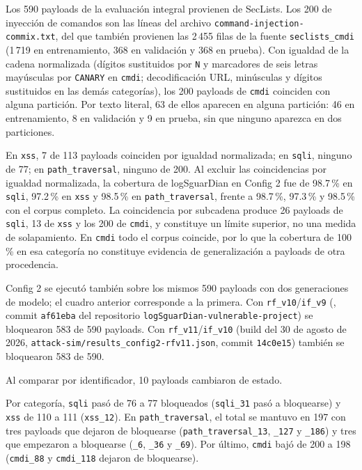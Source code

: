 Los 590 payloads de la evaluación integral provienen de SecLists. Los 200 de inyección de comandos son las líneas del archivo \texttt{command-injection-commix.txt}, del que también provienen las 2\,455 filas de la fuente \texttt{seclists\_cmdi} (1\,719 en entrenamiento, 368 en validación y 368 en prueba). Con igualdad de la cadena normalizada (dígitos sustituidos por \texttt{N} y marcadores de seis letras mayúsculas por \texttt{CANARY} en \texttt{cmdi}; decodificación URL, minúsculas y dígitos sustituidos en las demás categorías), los 200 payloads de \texttt{cmdi} coinciden con alguna partición. Por texto literal, 63 de ellos aparecen en alguna partición: 46 en entrenamiento, 8 en validación y 9 en prueba, sin que ninguno aparezca en dos particiones.

En \texttt{xss}, 7 de 113 payloads coinciden por igualdad normalizada; en \texttt{sqli}, ninguno de 77; en \texttt{path\_traversal}, ninguno de 200. Al excluir las coincidencias por igualdad normalizada, la cobertura de logSguarDian en Config 2 fue de 98.7\,\% en \texttt{sqli}, 97.2\,\% en \texttt{xss} y 98.5\,\% en \texttt{path\_traversal}, frente a 98.7\,\%, 97.3\,\% y 98.5\,\% con el corpus completo. La coincidencia por subcadena produce 26 payloads de \texttt{sqli}, 13 de \texttt{xss} y los 200 de \texttt{cmdi}, y constituye un límite superior, no una medida de solapamiento. En \texttt{cmdi} todo el corpus coincide, por lo que la cobertura de 100\,\% en esa categoría no constituye evidencia de generalización a payloads de otra procedencia.

Config 2 se ejecutó también sobre los mismos 590 payloads con dos generaciones de modelo; el cuadro anterior corresponde a la primera. Con \texttt{rf\_v10}/\texttt{if\_v9} (, commit \texttt{af61eba} del repositorio \texttt{logSguarDian-vulnerable-project}) se bloquearon 583 de 590 payloads. Con \texttt{rf\_v11}/\texttt{if\_v10} (build del 30 de agosto de 2026, \texttt{attack-sim/results\_config2-rfv11.json}, commit \texttt{14c0e15}) también se bloquearon 583 de 590.

Al comparar por identificador, 10 payloads cambiaron de estado.

Por categoría, \texttt{sqli} pasó de 76 a 77 bloqueados (\texttt{sqli\_31} pasó a bloquearse) y \texttt{xss} de 110 a 111 (\texttt{xss\_12}). En \texttt{path\_traversal}, el total se mantuvo en 197 con tres payloads que dejaron de bloquearse (\texttt{path\_traversal\_13}, \texttt{\_127} y \texttt{\_186}) y tres que empezaron a bloquearse (\texttt{\_6}, \texttt{\_36} y \texttt{\_69}). Por último, \texttt{cmdi} bajó de 200 a 198 (\texttt{cmdi\_88} y \texttt{cmdi\_118} dejaron de bloquearse). 

